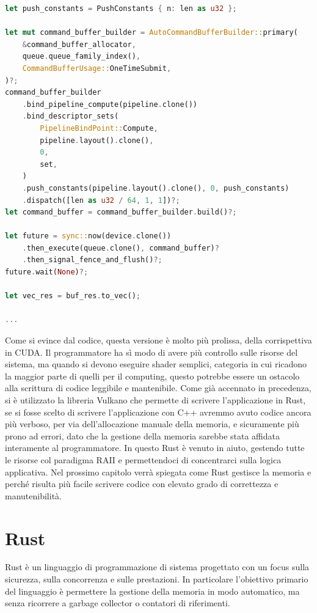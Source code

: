 \vspace{5mm}
\begin{lstlisting}[language=Rust, caption=Command buffer e dispatch, label=lis:vulkan_dispatch]
let push_constants = PushConstants { n: len as u32 };

let mut command_buffer_builder = AutoCommandBufferBuilder::primary(
    &command_buffer_allocator,
    queue.queue_family_index(),
    CommandBufferUsage::OneTimeSubmit,
)?;
command_buffer_builder
    .bind_pipeline_compute(pipeline.clone())
    .bind_descriptor_sets(
        PipelineBindPoint::Compute,
        pipeline.layout().clone(),
        0,
        set,
    )
    .push_constants(pipeline.layout().clone(), 0, push_constants)
    .dispatch([len as u32 / 64, 1, 1])?;
let command_buffer = command_buffer_builder.build()?;

let future = sync::now(device.clone())
    .then_execute(queue.clone(), command_buffer)?
    .then_signal_fence_and_flush()?;
future.wait(None)?;

let vec_res = buf_res.to_vec();

...
\end{lstlisting}
\vspace{5mm}

Come si evince dal codice, questa versione è molto più prolissa, della corrispettiva in CUDA. Il programmatore ha sì modo di avere più controllo sulle risorse del sistema, ma quando si devono eseguire shader semplici, categoria in cui ricadono la maggior parte di quelli per il computing, questo potrebbe essere un ostacolo alla scrittura di codice leggibile e mantenibile. Come già accennato in precedenza, si è utilizzato la libreria Vulkano che permette di scrivere l'applicazione in Rust, se si fosse scelto di scrivere l'applicazione con C++ avremmo avuto codice ancora più verboso, per via dell'allocazione manuale della memoria, e sicuramente più prono ad errori, dato che la gestione della memoria sarebbe stata affidata interamente al programmatore. In questo Rust è venuto in aiuto, gestendo tutte le risorse col paradigma RAII e permettendoci di concentrarci sulla logica applicativa. Nel prossimo capitolo verrà spiegata come  Rust gestisce la memoria e perché risulta più facile scrivere codice con elevato grado di correttezza e manutenibilità.

\section[Rust]{Rust}

Rust è un linguaggio di programmazione di sistema progettato con un focus sulla sicurezza, sulla concorrenza e sulle prestazioni. In particolare l'obiettivo primario del linguaggio è permettere la gestione della memoria in modo automatico, ma senza ricorrere a garbage collector o contatori di riferimenti. 

